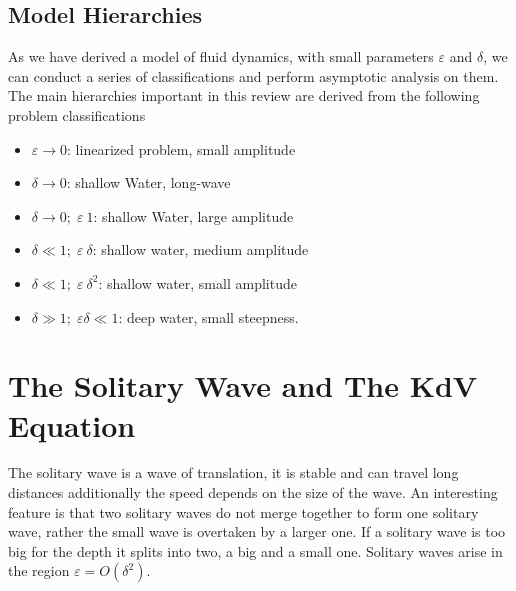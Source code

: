 \subsection{Model Hierarchies}
As we have derived a model of fluid dynamics, with small parameters
$\varepsilon$ and $\delta$, we can conduct a series of classifications and
perform asymptotic analysis on them. The main hierarchies important in this
review are derived from the following problem classifications
\begin{itemize}
    \item $\varepsilon\rightarrow 0$: linearized problem, small amplitude
    \item $\delta\rightarrow 0$: shallow Water, long-wave
    \item$\delta \rightarrow 0;\; \varepsilon~1$: shallow Water, large
        amplitude
    \item $\delta\ll 1;\; \varepsilon~\delta$: shallow water, medium
        amplitude
    \item $\delta\ll 1;\; \varepsilon~\delta^2$: shallow water, small
        amplitude
    \item $\delta \gg 1;\; \varepsilon\delta\ll 1$: deep water, small
        steepness.
\end{itemize}

\section{The Solitary Wave and The KdV Equation}
The solitary wave is a wave of translation, it is stable and can travel long
distances additionally the speed depends on the size of the wave. An
interesting feature is that two solitary waves do not merge together to form
one solitary wave, rather the small wave is overtaken by a larger one. If a
solitary wave is too big for the depth it splits into two, a big and a small
one. Solitary waves arise in the region $\varepsilon=O(\delta^2)$.


